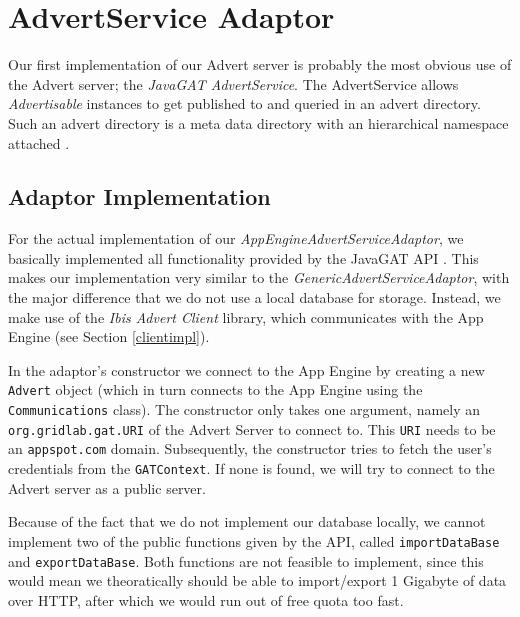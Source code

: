 \section{AdvertService Adaptor}
\label{advertservice}
Our first implementation of our Advert server is probably the most obvious use
of the Advert server; the \emph{JavaGAT AdvertService}. The AdvertService
allows \emph{Advertisable} instances to get published to and queried in an
advert directory. Such an advert directory is a meta data directory with an
hierarchical namespace attached \cite{javagat-javadoc}.

\subsection{Adaptor Implementation}
For the actual implementation of our \emph{AppEngineAdvertServiceAdaptor}, we
basically implemented all functionality provided by the JavaGAT API
\cite{javagat-javadoc}. This makes our implementation very similar to the
\emph{GenericAdvertServiceAdaptor}, with the major difference that we do not
use a local database for storage. Instead, we make use of the \emph{Ibis Advert
Client} library, which communicates with the App Engine (see Section 
\ref{clientimpl}). 

In the adaptor's constructor we connect to the App Engine by creating a new
\texttt{Advert} object (which in turn connects to the App Engine using the
\texttt{Communications} class). The constructor only takes one argument, namely
an \texttt{org.gridlab.gat.URI} of the Advert Server to connect to. This
\texttt{URI} needs to be an \texttt{appspot.com} domain. Subsequently, the
constructor tries to fetch the user's credentials from the \texttt{GATContext}. 
If none is found, we will try to connect to the Advert server as a public
server.

Because of the fact that we do not implement our database locally, we cannot
implement two of the public functions given by the API, called
\texttt{importDataBase} and \texttt{exportDataBase}. Both functions are not
feasible to implement, since this would mean we theoratically should be able to
import/export 1 Gigabyte of data over HTTP, after which we would run out of
free quota too fast.
